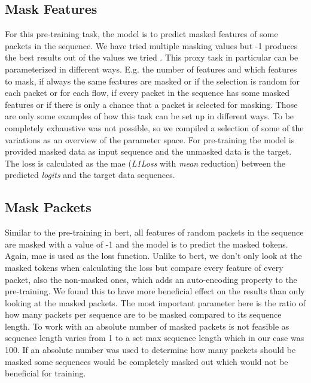 \subsection{Mask Features} \label{sec:experiments_lstm_mask_feature}

For this pre-training task, the model is to predict masked features of some packets in the sequence. We have tried multiple masking values but -1 produces the best results out of the values we tried . This proxy task in particular can be parameterized in different ways. E.g. the number of features and which features to mask, if always the same features are masked or if the selection is random for each packet or for each flow, if every packet in the sequence has some masked features or if there is only a chance that a packet is selected for masking. Those are only some examples of how this task can be set up in different ways. To be completely exhaustive was not possible, so we compiled a selection of some of the variations as an overview of the parameter space. For pre-training the model is provided masked data as input sequence and the unmasked data is the target. The loss is calculated as the \gls{mae} (\textit{L1Loss} with \textit{mean} reduction) between the predicted \textit{logits} and the target data sequences. 

\subsection{Mask Packets} \label{sec:experiments_lstm_mask_packet}

Similar to the pre-training in \gls{bert}, all features of random packets in the sequence are masked with a value of -1 and the model is to predict the masked tokens. Again, \gls{mae} is used as the loss function. Unlike to \gls{bert}, we don't only look at the masked tokens when calculating the loss but compare every feature of every packet, also the non-masked ones, which adds an auto-encoding property to the pre-training. We found this to have more beneficial effect on the results than only looking at the masked packets. The most important parameter here is the ratio of how many packets per sequence are to be masked compared to its sequence length. To work with an absolute number of masked packets is not feasible as sequence length varies from 1 to a set max sequence length which in our case was 100. If an absolute number was used to determine how many packets should be masked some sequences would be completely masked out which would not be beneficial for training.

